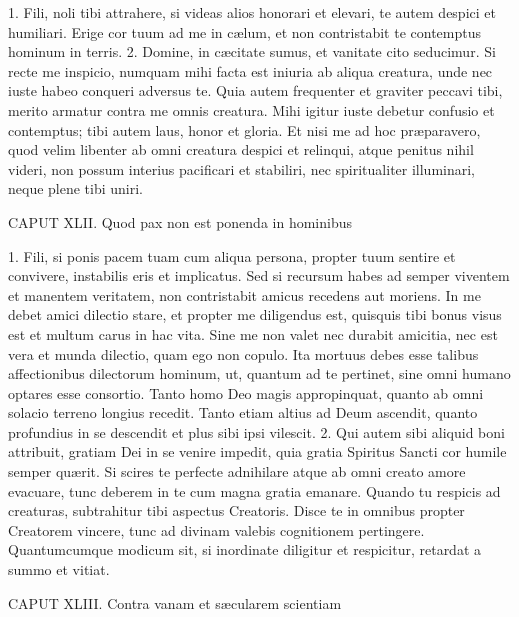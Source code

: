 1. Fili, noli tibi attrahere, si videas alios honorari et elevari, te autem despici et humiliari. Erige cor tuum ad me in cælum, et non contristabit te contemptus hominum in terris.
2. Domine, in cæcitate sumus, et vanitate cito seducimur. Si recte me inspicio, numquam mihi facta est iniuria ab aliqua creatura, unde nec iuste habeo conqueri adversus te. Quia autem frequenter et graviter peccavi tibi, merito armatur contra me omnis creatura. Mihi igitur iuste debetur confusio et contemptus; tibi autem laus, honor et gloria. Et nisi me ad hoc præparavero, quod velim libenter ab omni creatura despici et relinqui, atque penitus nihil videri, non possum interius pacificari et stabiliri, nec spiritualiter illuminari, neque plene tibi uniri.


CAPUT XLII.
Quod pax non est ponenda in hominibus

1. Fili, si ponis pacem tuam cum aliqua persona, propter tuum sentire et convivere, instabilis eris et implicatus. Sed si recursum habes ad semper viventem et manentem veritatem, non contristabit amicus recedens aut moriens. In me debet amici dilectio stare, et propter me diligendus est, quisquis tibi bonus visus est et multum carus in hac vita. Sine me non valet nec durabit amicitia, nec
est vera et munda dilectio, quam ego non copulo. Ita mortuus debes esse talibus affectionibus dilectorum hominum, ut, quantum ad te pertinet, sine omni humano optares esse consortio. Tanto homo Deo magis appropinquat, quanto ab omni solacio terreno longius recedit. Tanto etiam altius ad Deum ascendit, quanto profundius in se descendit et plus sibi ipsi vilescit.
2. Qui autem sibi aliquid boni attribuit, gratiam Dei in se venire impedit, quia gratia Spiritus Sancti cor humile semper quærit. Si scires te perfecte adnihilare atque ab omni creato amore evacuare, tunc deberem in te cum magna gratia emanare. Quando tu respicis ad creaturas, subtrahitur tibi aspectus Creatoris. Disce te in omnibus propter Creatorem vincere, tunc ad divinam valebis cognitionem pertingere. Quantumcumque modicum sit, si inordinate diligitur et respicitur, retardat a summo et vitiat.


CAPUT XLIII.
Contra vanam et sæcularem scientiam

